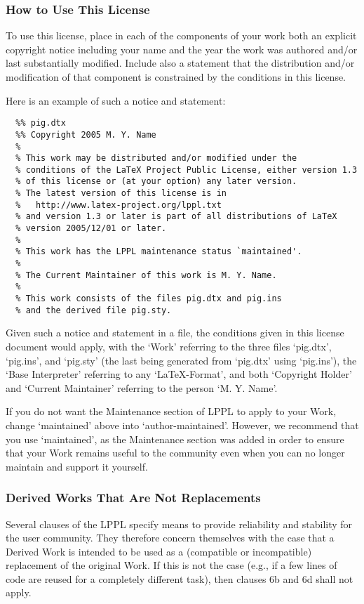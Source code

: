 \subsubsection{How to Use This License}

To use this license, place in each of the components of your work both
an explicit copyright notice including your name and the year the work
was authored and/or last substantially modified.  Include also a
statement that the distribution and/or modification of that
component is constrained by the conditions in this license.

Here is an example of such a notice and statement:
\begin{lstlisting}
  %% pig.dtx
  %% Copyright 2005 M. Y. Name
  %
  % This work may be distributed and/or modified under the
  % conditions of the LaTeX Project Public License, either version 1.3
  % of this license or (at your option) any later version.
  % The latest version of this license is in
  %   http://www.latex-project.org/lppl.txt
  % and version 1.3 or later is part of all distributions of LaTeX
  % version 2005/12/01 or later.
  %
  % This work has the LPPL maintenance status `maintained'.
  % 
  % The Current Maintainer of this work is M. Y. Name.
  %
  % This work consists of the files pig.dtx and pig.ins
  % and the derived file pig.sty.
\end{lstlisting}
Given such a notice and statement in a file, the conditions
given in this license document would apply, with the `Work' referring
to the three files `pig.dtx', `pig.ins', and `pig.sty' (the last being
generated from `pig.dtx' using `pig.ins'), the `Base Interpreter'
referring to any `LaTeX-Format', and both `Copyright Holder' and
`Current Maintainer' referring to the person `M. Y. Name'.

If you do not want the Maintenance section of LPPL to apply to your
Work, change `maintained' above into `author-maintained'.  
However, we recommend that you use `maintained', as the Maintenance
section was added in order to ensure that your Work remains useful to
the community even when you can no longer maintain and support it
yourself.

\subsubsection{Derived Works That Are Not Replacements}

Several clauses of the LPPL specify means to provide reliability and
stability for the user community. They therefore concern themselves
with the case that a Derived Work is intended to be used as a
(compatible or incompatible) replacement of the original Work. If
this is not the case (e.g., if a few lines of code are reused for a
completely different task), then clauses 6b and 6d shall not apply.


